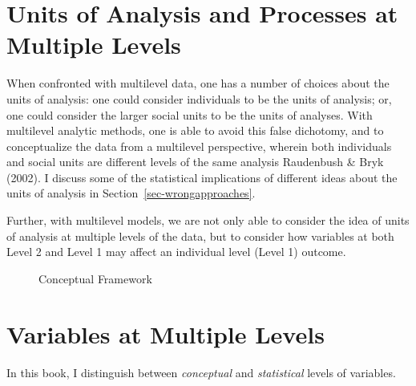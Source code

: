 \documentclass[
  letterpaper,
  DIV=11,
  numbers=noendperiod]{scrreprt}
\begin{document}
\section{Units of Analysis and Processes at Multiple
Levels}\label{units-of-analysis-and-processes-at-multiple-levels}

When confronted with multilevel data, one has a number of choices about
the units of analysis: one could consider individuals to be the units of
analysis; or, one could consider the larger social units to be the units
of analyses. With multilevel analytic methods, one is able to avoid this
false dichotomy, and to conceptualize the data from a multilevel
perspective, wherein both individuals and social units are different
levels of the same analysis Raudenbush \& Bryk (2002). I discuss some of
the statistical implications of different ideas about the units of
analysis in Section~\ref{sec-wrongapproaches}. 

Further, with multilevel models, we are not only able to consider the
idea of units of analysis at multiple levels of the data, but to
consider how variables at both Level 2 and Level 1 may affect an
individual level (Level 1) outcome.

\begin{figure}


\caption{\label{fig-conceptual}Conceptual Framework}

\end{figure}%

\section{Variables at Multiple Levels}\label{sec-levels}

In this book, I distinguish between \emph{conceptual} and
\emph{statistical} levels of variables.
\end{document}
